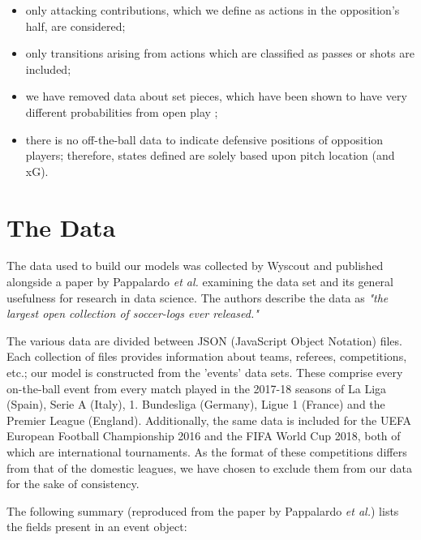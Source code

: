 \documentclass{l4proj}
\begin{document}
\begin{itemize}
    \item only attacking contributions, which we define as actions in the opposition's half, are considered;
    \item only transitions arising from actions which are classified as passes or shots are included;
    \item we have removed data about set pieces, which have been shown to have very different probabilities from open play \cite{rudd1};
    \item there is no off-the-ball data to indicate defensive positions of opposition players; therefore, states defined are solely based upon pitch location (and xG).
\end{itemize}

\section{The Data}\label{data}

The data used to build our models was collected by Wyscout \cite{wysc1} and published alongside a paper by Pappalardo \textit{et al.} \cite{data1} examining the data set and its general usefulness for research in data science. The authors describe the data as \textit{"the largest open collection of soccer-logs ever released."}

The various data are divided between JSON (JavaScript Object Notation) files. Each collection of files provides information about teams, referees, competitions, etc.; our model is constructed from the 'events' data sets. These comprise every on-the-ball event from every match played in the 2017-18 seasons of La Liga (Spain), Serie A (Italy), 1. Bundesliga (Germany), Ligue 1 (France) and the Premier League (England). Additionally, the same data is included for the UEFA European Football Championship 2016 and the FIFA World Cup 2018, both of which are international tournaments. As the format of these competitions differs from that of the domestic leagues, we have chosen to exclude them from our data for the sake of consistency.

The following summary (reproduced from the paper by Pappalardo \textit{et al.}) lists the fields present in an event object:
\end{document}
